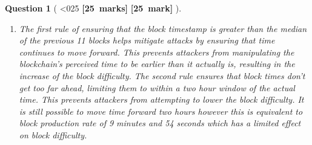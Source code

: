 \documentclass[a4paper]{article}
\theoremstyle{que}
\newtheorem{question}{Question}
\newcommand\points[1]{%
\ifnum1<0#1\relax%
    {\bf \small [#1~marks]}%
  \else%
    {\bf \small [#1~mark]}%
  \fi%
}%
\begin{document}
\begin{question}[\points{25}]
\begin{enumerate}[label=(\alph*)]
    \item[(iii)] The first rule of ensuring that the block timestamp is greater than the median of the previous 11 blocks helps mitigate attacks by ensuring that time continues to move forward. This prevents attackers from manipulating the blockchain's perceived time to be earlier than it actually is, resulting in the increase of the block difficulty. The second rule ensures that block times don't get too far ahead, limiting them to within a two hour window of the actual time. This prevents attackers from attempting to lower the block difficulty. It is still possible to move time forward two hours however this is equivalent to block production rate of 9 minutes and 54 seconds \cite{bitmex_block_timestamp} which has a limited effect on block difficulty.
  \end{enumerate}
\end{question}

\newpage

\end{document}
